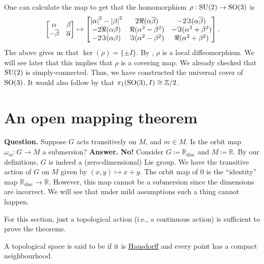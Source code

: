 \documentclass[12pt]{article}
\begin{document}
One can calculate the map to get that the homomorphism $\rho : \operatorname{SU}(2) \to \operatorname{SO}(3)$ is
\begin{equation*} 
	\begin{bmatrix} \alpha & \beta \\ -\overline{\beta} & \overline{\alpha} \end{bmatrix} 
	\mapsto
	\begin{bmatrix}
		{\left\lvert \alpha \right\lvert}^{2} - {\left\lvert \beta \right\lvert}^{2} & 2 \Re(\alpha \overline{\beta}) & -2 \Im(\alpha \overline{\beta}) \\
		-2 \Re(\alpha \beta) & \Re(\alpha^{2} - \beta^{2}) & -\Im(\alpha^{2} + \beta^{2}) \\
		-2 \Im(\alpha \beta) & \Im(\alpha^{2} - \beta^{2}) & \Re(\alpha^{2} + \beta^{2}) \\
	\end{bmatrix}.
\end{equation*}
The above gives us that $\ker(\rho) = \{\pm I\}$. 
By , $\rho$ is a local diffeomorphism. 
We will see later  that this implies that $\rho$ is a covering map. 
We already checked that $\operatorname{SU}(2)$ is simply-connected. 
Thus, we have constructed the universal cover of $\operatorname{SO}(3)$. 
It would also follow by  that $\pi_{1}(\operatorname{SO}(3), I) \cong \mathbb{Z}/2$.

\section{An open mapping theorem}

\textbf{Question.} Suppose $G$ acts transitively on $M$, and $m \in M$. Is the orbit map $\omega_{m} : G \to M$ a submersion? \newline
\textbf{Answer.} {\color{red}\textbf{No!}} Consider $G \coloneqq \mathbb{R}_{\text{disc}}$ and $M \coloneqq \mathbb{R}$. 
By our definitions, $G$ is indeed a (zero-dimensional) Lie group. \newline
We have the transitive action of $G$ on $M$ given by $(x, y) \mapsto x + y$. 
The orbit map of $0$ is the ``identity'' map $\mathbb{R}_{\text{disc}} \to \mathbb{R}$. 
However, this map cannot be a submersion since the dimensions are incorrect. \newline
We will see that under mild assumptions  such a thing cannot happen.

For this section, just a topological action (i.e., a continuous action) is sufficient to prove the theorems.

\begin{defn}
	A topological space is said to be  if it is \underline{Hausdorff} and every point has a compact neighbourhood.
\end{defn}
\end{document}
